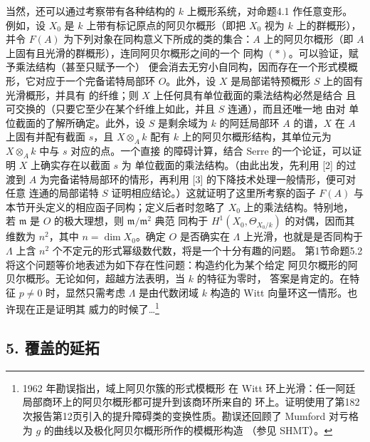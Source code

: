 当然，还可以通过考察带有各种结构的 $k$ 上概形系统，对命题4.1 作任意变形。
例如，设 $X_0$ 是 $k$ 上带有标记原点的阿贝尔概形（即把 $X_0$ 视为 $k$
上的群概形），并令 $F(A)$ 为下列对象在同构意义下所成的类的集合：$A$
上的阿贝尔概形（即 $A$ 上固有且光滑的群概形），连同阿贝尔概形之间的一个
同构 $(*)$。可以验证，赋予乘法结构（甚至只赋予一个）
便会消去无穷小自同构，因而存在一个形式模概形，它对应于一个完备诺特局部环
$O$。此外，设 $X$ 是局部诺特预概形 $S$ 上的固有光滑概形，并具有
的纤维；则 $X$ 上任何具有单位截面的乘法结构必然是结合
且可交换的（只要它至少在某个纤维上如此，并且 $S$ 连通），而且还唯一地
由对
单位截面的了解所确定。此外，设 $S$ 是剩余域为 $k$ 的阿廷局部环
$A$ 的谱，$X$ 在 $A$ 上固有并配有截面 $s$，且 $X\otimes_Ak$ 配有 $k$
上的阿贝尔概形结构，其单位元为 $X\otimes_Ak$ 中与 $s$ 对应的点。一个直接
的障碍计算，结合 Serre 的一个论证，可以证明 $X$ 上确实存在以截面 $s$ 为
单位截面的乘法结构。（由此出发，先利用 [2] 的过渡到
$A$ 为完备诺特局部环的情形，再利用 [3] 的下降技术处理一般情形，便可对任意
连通的局部诺特 $S$ 证明相应结论。）这就证明了这里所考察的函子 $F(A)$ 与
本节开头定义的相应函子同构；定义后者时忽略了 $X_0$ 上的乘法结构。特别地，
若 $\mathfrak m$ 是 $O$ 的极大理想，则 $\mathfrak m/\mathfrak m^2$ 典范
同构于 $H^1(X_0,\Theta_{X_0/k})$ 的对偶，因而其维数为 $n^2$，其中
$n=\dim X_0$。确定 $O$ 是否确实在 $\Lambda$ 上光滑，也就是是否同构于
$\Lambda$ 上含 $n^2$ 个不定元的形式幂级数代数，将是一个十分有趣的问题。
第1节命题5.2 将这个问题等价地表述为如下存在性问题：构造约化为某个给定
阿贝尔概形的阿贝尔概形。无论如何，超越方法表明，当 $k$ 的特征为零时，
答案是肯定的。在特征 $p\ne0$ 时，显然只需考虑 $\Lambda$ 是由代数闭域 $k$
构造的 Witt 向量环这一情形。也许现在正是证明其
威力的时候了\ldots\footnote{1962 年勘误指出，域上阿贝尔簇的形式模概形
在 Witt 环上光滑：任一阿廷局部商环上的阿贝尔概形都可提升到该商环所来自的
环上。证明使用了第182次报告第12页引入的提升障碍类的变换性质。勘误还回顾了
Mumford 对亏格为 $g$ 的曲线以及极化阿贝尔概形所作的模概形构造
（参见 SHMT）。}

\subsection*{5. 覆盖的延拓}

